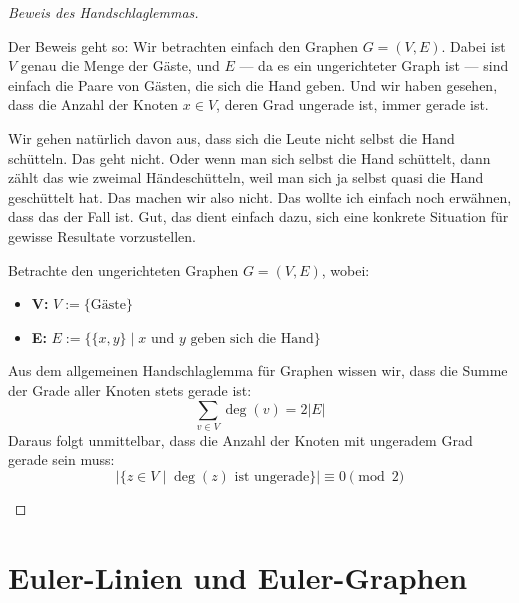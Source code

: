 \begin{math-stroke}
\end{math-stroke}

\begin{proof}[Beweis des Handschlaglemmas]
\begin{spoken-clean}[00:01:58 - 00:03:38]
Der Beweis geht so: Wir betrachten einfach den Graphen $G = (V, E)$. Dabei ist $V$ genau die Menge der Gäste, und $E$ --- da es ein ungerichteter Graph ist --- sind einfach die Paare von Gästen, die sich die Hand geben. Und wir haben gesehen, dass die Anzahl der Knoten $x \in V$, deren Grad ungerade ist, immer gerade ist. 

Wir gehen natürlich davon aus, dass sich die Leute nicht selbst die Hand schütteln. Das geht nicht. Oder wenn man sich selbst die Hand schüttelt, dann zählt das wie zweimal Händeschütteln, weil man sich ja selbst quasi die Hand geschüttelt hat. Das machen wir also nicht. Das wollte ich einfach noch erwähnen, dass das der Fall ist. Gut, das dient einfach dazu, sich eine konkrete Situation für gewisse Resultate vorzustellen.
\end{spoken-clean}

\begin{math-stroke}
Betrachte den ungerichteten Graphen $G = (V, E)$, wobei:
\begin{itemize}
    \item \textbf{V:} $V := \{\text{Gäste}\}$
    \item \textbf{E:} $E := \{\{x, y\} \mid x \text{ und } y \text{ geben sich die Hand}\}$
\end{itemize}
Aus dem allgemeinen Handschlaglemma für Graphen wissen wir, dass die Summe der Grade aller Knoten stets gerade ist:
\[
\sum_{v \in V} \deg(v) = 2|E|
\]
Daraus folgt unmittelbar, dass die Anzahl der Knoten mit ungeradem Grad gerade sein muss:
\[
\left| \bigl\{ z \in V \;\big|\; \deg(z) \text{ ist ungerade} \bigr\} \right| \equiv 0 \pmod 2
\]
\end{math-stroke}
\end{proof}

\section{Euler-Linien und Euler-Graphen}

